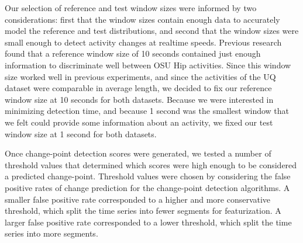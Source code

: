 Our selection of reference and test window sizes were informed by two considerations:
first that the window sizes contain enough data to accurately model the
reference and test distributions, and second that the window sizes were small enough
to detect activity changes at realtime speeds.
Previous research \cite{zheng12} found that a reference window size of 10
seconds contained just enough information to discriminate well between OSU Hip activities.
Since this window size worked well in previous experiments, and since the 
activities of the UQ dataset were comparable in average length, we decided to
fix our reference window size at 10 seconds for both datasets. Because we were interested in
minimizing detection time, and because 1 second was the smallest window that
we felt could provide some information about an activity, we fixed our test
window size at 1 second for both datasets.

Once change-point detection scores were generated, we tested a number of threshold values that determined which
scores were high enough to be considered a predicted change-point.
Threshold values were chosen by considering the false positive rates of
change prediction for the change-point detection algorithms. A smaller false positive rate
corresponded to a higher and more conservative threshold, which split the
time series into fewer segments for featurization. A larger false positive rate
corresponded to a lower threshold, which split the time series into more segments.
